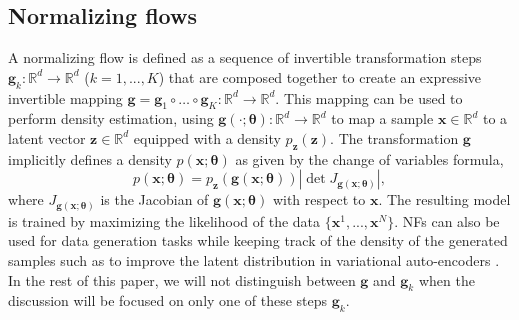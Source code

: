 \subsection{Normalizing flows}
A normalizing flow is defined as a sequence of invertible transformation steps $\mathbf{g}_k : \mathbb{R}^d \to \mathbb{R}^d$  ($k=1, ..., K$) that are composed together to create an expressive invertible mapping $\mathbf{g} = \mathbf{g}_1 \circ \dots \circ \mathbf{g}_K : \mathbb{R}^d \to \mathbb{R}^d$. %
This mapping can be used to perform density estimation, using $\mathbf{g}(\cdot ;\mathbf{\theta}): \mathbb{R}^d \rightarrow \mathbb{R}^d$ to map a sample $\mathbf{x} \in \mathbb{R}^d$ to a latent vector $\mathbf{z} \in \mathbb{R}^d$ equipped with a density $p_{\mathbf{z}}(\mathbf{z})$.
The transformation $\mathbf{g}$ implicitly defines a density $p(\mathbf{x}; \mathbf{\theta})$ as given by the change of variables formula,
\begin{equation*}
    p(\mathbf{x}; \mathbf{\theta}) = p_{\mathbf{z}}(\mathbf{g}(\mathbf{x};\mathbf{\theta})) \left| \det  J_{\mathbf{g}(\mathbf{x};\mathbf{\theta})} \right|, \label{eq:NF_DE}
\end{equation*}
where $J_{\mathbf{g}(\mathbf{x};\mathbf{\theta})}$ is the Jacobian of $\mathbf{g}(\mathbf{x};\mathbf{\theta})$ with respect to $\mathbf x$.
The resulting model is trained by maximizing the likelihood of the data $\{\mathbf{x}^1, ..., \mathbf{x}^N\}$. NFs can also be used for data generation tasks while keeping track of the density of the generated samples such as to improve the latent distribution in variational auto-encoders \citep{rezende2015variational}.
In the rest of this paper, we will not distinguish between $\mathbf{g}$ and $\mathbf{g}_k$ when the discussion will be focused on only one of these steps $\mathbf{g}_k$.

